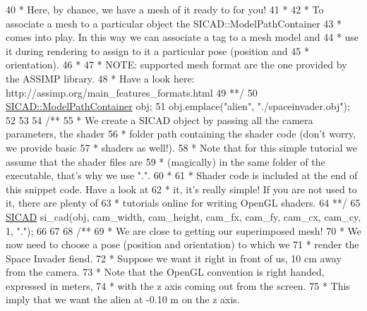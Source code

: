 \begin{DoxyCodeInclude}
40 \textcolor{comment}{     * Here, by chance, we have a mesh of it ready to for you!}
41 \textcolor{comment}{     *}
42 \textcolor{comment}{     * To associate a mesh to a particular object the SICAD::ModelPathContainer}
43 \textcolor{comment}{     * comes into play. In this way we can associate a tag to a mesh model and}
44 \textcolor{comment}{     * use it during rendering to assign to it a particular pose (position and}
45 \textcolor{comment}{     * orientation).}
46 \textcolor{comment}{     *}
47 \textcolor{comment}{     * NOTE: supported mesh format are the one provided by the ASSIMP library.}
48 \textcolor{comment}{     *       Have a look here: http://assimp.org/main\_features\_formats.html}
49 \textcolor{comment}{     **/}
50     \mbox{\hyperlink{classSICAD_a9e1e1460d4c0f331b4fd015aae4dd721}{SICAD::ModelPathContainer}} obj;
51     obj.emplace(\textcolor{stringliteral}{"alien"}, \textcolor{stringliteral}{"./spaceinvader.obj"});
52 
53 \textcolor{comment}{}
54 \textcolor{comment}{    /**}
55 \textcolor{comment}{     * We create a SICAD object by passing all the camera parameters, the shader}
56 \textcolor{comment}{     * folder path containing the shader code (don't worry, we provide basic}
57 \textcolor{comment}{     * shaders as well!).}
58 \textcolor{comment}{     * Note that for this simple tutorial we assume that the shader files are}
59 \textcolor{comment}{     * (magically) in the same folder of the executable, that's why we use ".".}
60 \textcolor{comment}{     *}
61 \textcolor{comment}{     * Shader code is included at the end of this snippet code. Have a look at}
62 \textcolor{comment}{     * it, it's really simple! If you are not used to it, there are plenty of}
63 \textcolor{comment}{     * tutorials online for writing OpenGL shaders.}
64 \textcolor{comment}{     **/}
65     \mbox{\hyperlink{classSICAD}{SICAD}} si\_cad(obj, cam\_width, cam\_height, cam\_fx, cam\_fy, cam\_cx, cam\_cy, 1, \textcolor{stringliteral}{"."});
66 
67 \textcolor{comment}{}
68 \textcolor{comment}{    /**}
69 \textcolor{comment}{     * We are close to getting our superimposed mesh!}
70 \textcolor{comment}{     * We now need to choose a pose (position and orientation) to which we}
71 \textcolor{comment}{     * render the Space Invader fiend.}
72 \textcolor{comment}{     * Suppose we want it right in front of us, 10 cm away from the camera.}
73 \textcolor{comment}{     * Note that the OpenGL convention is right handed, expressed in meters,}
74 \textcolor{comment}{     * with the z axis coming out from the screen.}
75 \textcolor{comment}{     * This imply that we want the alien at -0.10 m on the z axis.}

\end{DoxyCodeInclude}
